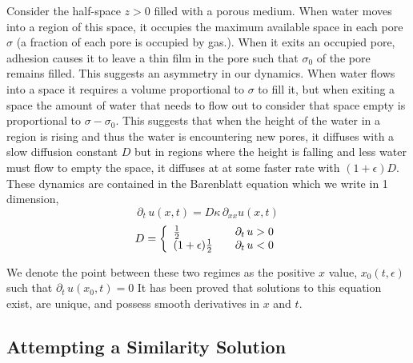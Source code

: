 Consider the half-space $z>0$ filled with a porous medium.  When water moves
into a region of this space, it occupies the maximum available space in each pore
$\sigma$ (a fraction of each pore is occupied by gas.).  When it exits an occupied
pore, adhesion causes it to leave a thin film in the pore such that $\sigma_0$
of the pore remains filled.  This suggests an asymmetry in our dynamics.  When
water flows into a space it requires a volume proportional to $\sigma$ to fill it,
but when exiting a space the amount of water that needs to flow out to consider that
space empty is proportional to $\sigma - \sigma_0$.  This suggests that when the
height of the water in a region is rising and thus the water is encountering new
pores, it diffuses with a slow diffusion constant $D$ but in regions where the height
is falling and less water must flow to empty the space, it diffuses at at some faster
rate with $(1 + \epsilon)D$.  These dynamics are contained in the Barenblatt equation which
we write in 1 dimension,
\[\partial_t \,u(x, t) = D\kappa\, \partial_{xx} u(x, t)\]
\[ D = \left\{
             \begin{array}{l l}
             \frac{1}{2} & \quad \partial_t \,u > 0 \\
             (1 + \epsilon)\frac{1}{2} &  \quad \partial_t \,u < 0
             \end{array} \right. \]

We denote the point between these two regimes as the positive $x$ value, $x_0(t, \epsilon)$
such that $\partial_t\, u(x_0, t) = 0$ It has been proved that solutions to this equation exist,
are unique, and possess smooth derivatives in $x$ and $t$.

\subsection{Attempting a Similarity Solution}

